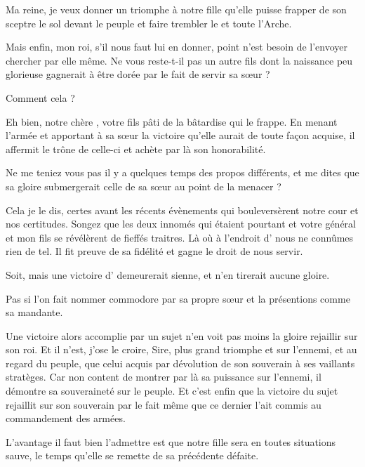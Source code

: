 \begin{drama}
  \roispeaks  Ma reine, je veux donner un triomphe à notre fille qu’elle puisse frapper de son sceptre le sol devant le peuple et faire trembler le \campprincipal{} et toute l’Arche.

  \reinespeaks Mais enfin, mon roi, s’il nous faut lui en donner, point n’est besoin de l’envoyer chercher par elle même. Ne vous reste-t-il pas un autre fils dont la naissance peu glorieuse  gagnerait à être dorée par le fait de servir sa sœur ?


  \roispeaks Comment cela ?

  \reinespeaks Eh bien, notre chère \elena{}, votre fils pâti de la bâtardise qui le frappe. En menant l’armée et apportant à sa sœur la victoire qu’elle aurait de toute façon acquise, il affermit le trône de celle-ci et achète par là son honorabilité.


  \roispeaks Ne me teniez vous pas il y a quelques temps des propos différents, et me dites que sa gloire submergerait celle de sa sœur au point de la menacer ?

  \reinespeaks Cela je le dis, certes avant les récents évènements qui bouleversèrent notre cour et nos certitudes. Songez que les deux innomés qui étaient pourtant et votre général et mon fils se révélèrent de fieffés traitres. Là où à l’endroit d’\elena{} nous ne connûmes rien de tel. Il fit preuve de sa fidélité et gagne le droit de nous servir.


  \roispeaks Soit, mais une victoire d’\elena{} demeurerait sienne, et \princesse{} n’en tirerait aucune gloire.

  \reinespeaks Pas si l’on fait nommer \elena{} commodore par sa propre sœur et la présentions comme sa mandante.

  Une victoire alors accomplie par un sujet n’en voit pas moins la gloire rejaillir sur son roi. Et il n’est, j’ose le croire, Sire, plus grand triomphe et sur l’ennemi, et au regard du peuple, que celui acquis par dévolution de son souverain à ses vaillants stratèges.
  Car non content de montrer par là sa puissance sur l’ennemi, il démontre sa souveraineté sur le peuple.
  Et c’est enfin que la victoire du sujet rejaillit sur son souverain par le fait même que ce dernier l’ait commis au commandement des armées.


  \roispeaks L’avantage il faut bien l’admettre est que notre fille sera en toutes situations sauve, le temps qu’elle se remette de sa précédente défaite.


\end{drama}
